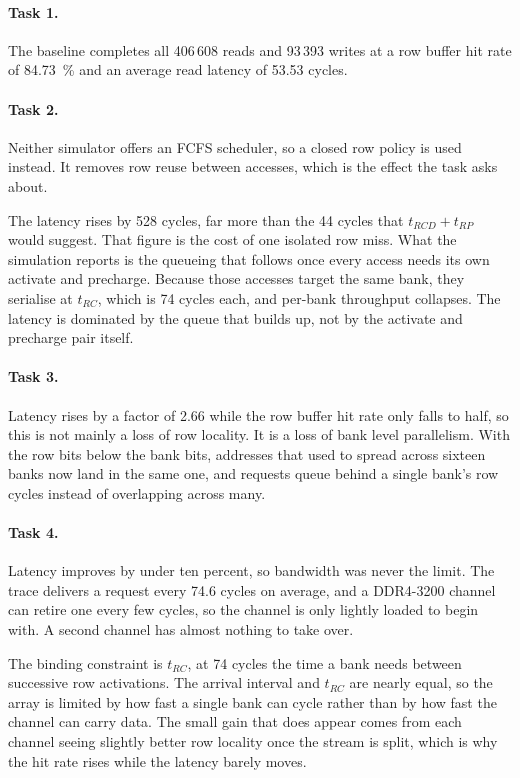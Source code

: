\documentclass[9pt,a4paper]{extarticle}
\begin{document}
\paragraph{Task 1.}

The baseline completes all 406\,608 reads and 93\,393 writes at a
row buffer hit rate of \SI{84.73}{\percent} and an average read latency of
53.53 cycles.

\paragraph{Task 2.}

Neither simulator offers an FCFS scheduler, so a closed row policy is used
instead. It removes row reuse between accesses, which is the effect the
task asks about.

The latency rises by 528 cycles, far more than the 44 cycles that
$t_{RCD} + t_{RP}$ would suggest. That figure is the cost of one isolated
row miss. What the simulation reports is the queueing that follows once
every access needs its own activate and precharge. Because those accesses
target the same bank, they serialise at $t_{RC}$, which is 74 cycles each,
and per-bank throughput collapses. The latency is dominated by the queue
that builds up, not by the activate and precharge pair itself.

\paragraph{Task 3.}

Latency rises by a factor of 2.66 while the row buffer hit rate only falls
to half, so this is not mainly a loss of row locality. It is a loss of
bank level parallelism. With the row bits below the bank bits, addresses
that used to spread across sixteen banks now land in the same one, and
requests queue behind a single bank's row cycles instead of overlapping
across many.

\paragraph{Task 4.}

Latency improves by under ten percent, so bandwidth was never the limit.
The trace delivers a request every 74.6 cycles on average, and a
DDR4-3200 channel can retire one every few cycles, so the channel is only
lightly loaded to begin with. A second channel has almost nothing to take
over.

The binding constraint is $t_{RC}$, at 74 cycles the time a bank needs
between successive row activations. The arrival interval and $t_{RC}$ are
nearly equal, so the array is limited by how fast a single bank can cycle
rather than by how fast the channel can carry data. The small gain that
does appear comes from each channel seeing slightly better row locality
once the stream is split, which is why the hit rate rises while the
latency barely moves.
\end{document}
